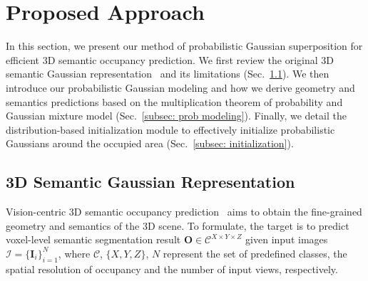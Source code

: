 \section{Proposed Approach}
\label{sec: approach}
In this section, we present our method of probabilistic Gaussian superposition for efficient 3D semantic occupancy prediction.
We first review the original 3D semantic Gaussian representation~\cite{huang2024gaussian} and its limitations (Sec.~\ref{subsec: old gaussian}).
We then introduce our probabilistic Gaussian modeling and how we derive geometry and semantics predictions based on the multiplication theorem of probability and Gaussian mixture model (Sec.~\ref{subsec: prob modeling}).
Finally, we detail the distribution-based initialization module to effectively initialize probabilistic Gaussians around the occupied area (Sec.~\ref{subsec: initialization}).


\subsection{3D Semantic Gaussian Representation}
\label{subsec: old gaussian}
Vision-centric 3D semantic occupancy prediction~\cite{cao2022monoscene,huang2023tri} aims to obtain the fine-grained geometry and semantics of the 3D scene.
To formulate, the target is to predict voxel-level semantic segmentation result $\mathbf{O}\in \mathcal{C}^{X\times Y\times Z}$ given input images $\mathcal{I}=\{\mathbf{I}_i\}_{i=1}^{N}$, where $\mathcal{C}$, $\{X, Y, Z\}$, $N$ represent the set of predefined classes, the spatial resolution of occupancy and the number of input views, respectively.

